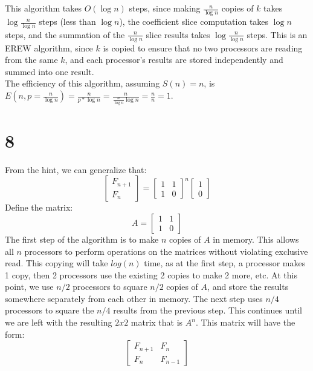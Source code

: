 \documentclass[letterpaper,notitlepage,twoside]{article}
\begin{document}
\\\\
This algorithm takes $O(\log n)$ steps, since making $\frac{n}{\log n}$ copies of $k$ takes $\log \frac{n}{\log n}$ steps (less than $\log n$), the coefficient slice computation takes $\log n$ steps, and the summation of the $\frac{n}{\log n}$ slice results takes $\log \frac{n}{\log n}$ steps. This is an EREW algorithm, since $k$ is copied to ensure that no two processors are reading from the same $k$, and each processor's results are stored independently and summed into one result.
\\
The efficiency of this algorithm, assuming $S(n) = n$, is $E(n, p = \frac{n}{\log n}) = \frac{n}{p * \log n} = \frac{n}{\frac{n}{\log n} \log n} = \frac{n}{n} = 1$.

\section*{8}
From the hint, we can generalize that:
\[
  \begin{bmatrix}
    F_{n+1} \\
    F_n 
  \end{bmatrix}
  =
   \begin{bmatrix}
    1&1 \\
    1&0 
  \end{bmatrix}^n
   \begin{bmatrix}
    1\\
    0 
  \end{bmatrix}
\]
Define the matrix:
\[ A=\begin{bmatrix}
    1&1 \\
    1&0 
  \end{bmatrix}
\]
The first step of the algorithm is to make $n$ copies of $A$ in memory. This allows all $n$ processors to perform operations on the matrices without violating exclusive read. This copying will take $log(n)$ time, as at the first step, a processor makes 1 copy, then 2 processors use the existing 2 copies to make 2 more, etc. At this point, we use $n/2$ processors to square $n/2$ copies of $A$, and store the results somewhere separately from each other in memory. The next step uses $n/4$ processors to square the $n/4$ results from the previous step. This continues until we are left with the resulting $2x2$ matrix that is $A^n$. This matrix will have the form:
\[
  \begin{bmatrix}
    F_{n+1} & F_n \\
    F_n & F_{n-1} 
  \end{bmatrix}
\]
\end{document}
